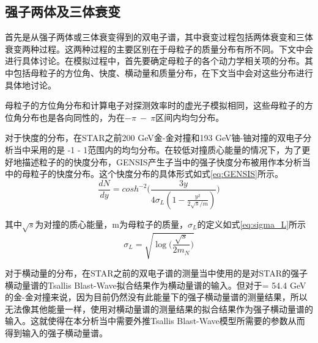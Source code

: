 \subsection{强子两体及三体衰变}

首先是从强子两体或三体衰变得到的双电子谱，其中衰变过程包括两体衰变和三体衰变两种过程。这两种过程的主要区别在于母粒子的质量分布有所不同。下文中会进行具体讨论。在模拟过程中，首先要确定母粒子的各个动力学相关项的分布。其中包括母粒子的方位角、快度、横动量和质量分布，在下文当中会对这些分布进行具体地讨论。

母粒子的方位角分布和计算电子对探测效率时的虚光子模拟相同，这些母粒子的方位角分布也是各向同性的，为在$-\pi~-~\pi$区间内均匀分布。

对于快度的分布，在STAR之前200 GeV金-金对撞和193 GeV铀-铀对撞的双电子分析当中采用的是 -1 - 1范围内的均匀分布。在较低对撞质心能量的情况下，为了更好地描述粒子的的快度分布，GENSIS产生子当中的强子快度分布被用作本分析当中的母粒子的快度分布。这个快度分布的具体形式如式\ref{eq:GENSIS}所示。
\begin{equation}
    \label{eq:GENSIS}
    \frac{dN}{dy} = cosh^{-2} {\Big(} \frac{3y}{4\sigma_L(1-\frac{y^2}{2\sqrt{s}/m})} {\Big)}
\end{equation}

其中$\sqrt{s}$为对撞的质心能量，m为母粒子的质量，$\sigma_L$的定义如式\ref{eq:sigma_L}所示
\begin{equation}
    \label{eq:sigma_L}
    \sigma_L = \sqrt{\log \big(\frac{\sqrt{s}}{2m_N}\big)}
\end{equation}

对于横动量的分布，在STAR之前的双电子谱的测量当中使用的是对STAR的强子横动量谱的Tsallis Blast-Wave拟合结果作为横动量谱的输入。但对于\sNN = 54.4 GeV的金-金对撞来说，因为目前仍然没有此能量下的强子横动量谱的测量结果，所以无法像其他能量一样，使用对横动量谱的测量结果的拟合结果作为强子横动量谱的输入。这就使得在本分析当中需要外推Tsallis Blast-Wave模型所需要的参数从而得到输入的强子横动量谱。

